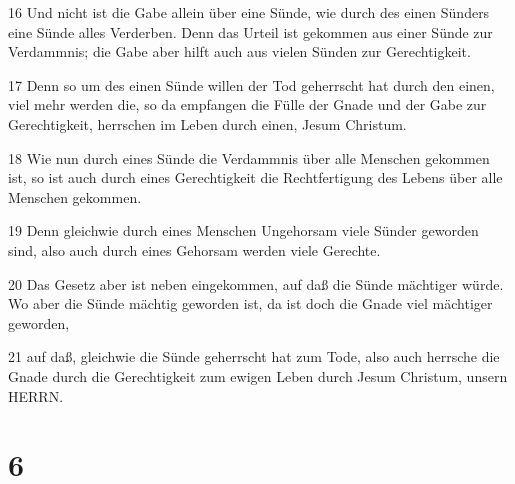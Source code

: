 \par 16 Und nicht ist die Gabe allein über eine Sünde, wie durch des einen Sünders eine Sünde alles Verderben. Denn das Urteil ist gekommen aus einer Sünde zur Verdammnis; die Gabe aber hilft auch aus vielen Sünden zur Gerechtigkeit.
\par 17 Denn so um des einen Sünde willen der Tod geherrscht hat durch den einen, viel mehr werden die, so da empfangen die Fülle der Gnade und der Gabe zur Gerechtigkeit, herrschen im Leben durch einen, Jesum Christum.
\par 18 Wie nun durch eines Sünde die Verdammnis über alle Menschen gekommen ist, so ist auch durch eines Gerechtigkeit die Rechtfertigung des Lebens über alle Menschen gekommen.
\par 19 Denn gleichwie durch eines Menschen Ungehorsam viele Sünder geworden sind, also auch durch eines Gehorsam werden viele Gerechte.
\par 20 Das Gesetz aber ist neben eingekommen, auf daß die Sünde mächtiger würde. Wo aber die Sünde mächtig geworden ist, da ist doch die Gnade viel mächtiger geworden,
\par 21 auf daß, gleichwie die Sünde geherrscht hat zum Tode, also auch herrsche die Gnade durch die Gerechtigkeit zum ewigen Leben durch Jesum Christum, unsern HERRN.

\chapter{6}


